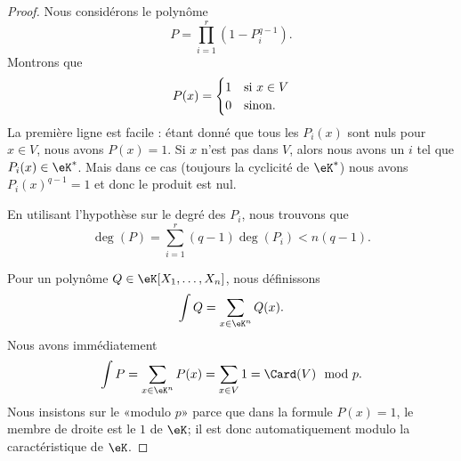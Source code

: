 \begin{proof}
    Nous considérons le polynôme
    \begin{equation}
        P=\prod_{i=1}^r(1-P_i^{q-1}).
    \end{equation}
    Montrons que
    \begin{equation}
        P(x)=\begin{cases}
            1    &   \text{si \( x\in V\)}\\
            0    &    \text{sinon}.
        \end{cases}
    \end{equation}
    La première ligne est facile : étant donné que tous les \( P_i(x)\) sont nuls pour \( x\in V\), nous avons \( P(x)=1\). Si \( x\) n'est pas dans \( V\), alors nous avons un \( i\) tel que \( P_i(x)\in \eK^*\). Mais dans ce cas (toujours la cyclicité de \( \eK^*\)) nous avons \( P_i(x)^{q-1}=1\) et donc le produit est nul.

    En utilisant l'hypothèse sur le degré des \( P_i\), nous trouvons que
    \begin{equation}
        \deg(P)=\sum_{i=1}^r(q-1)\deg(P_i)<n(q-1).
    \end{equation}

    Pour un polynôme \( Q\in \eK[X_1,\ldots, X_n]\), nous définissons 
    \begin{equation}
        \int Q=\sum_{x\in \eK^n}Q(x).
    \end{equation}
    Nous avons immédiatement
    \begin{equation}
        \int P=\sum_{x\in \eK^n}P(x)=\sum_{x\in V}1=\Card(V)\mod p.
    \end{equation}
    Nous insistons sur le «modulo \( p\)» parce que dans la formule \( P(x)=1\), le membre de droite est le \( 1\) de \( \eK\); il est donc automatiquement modulo la caractéristique de \( \eK\).


\end{proof}
